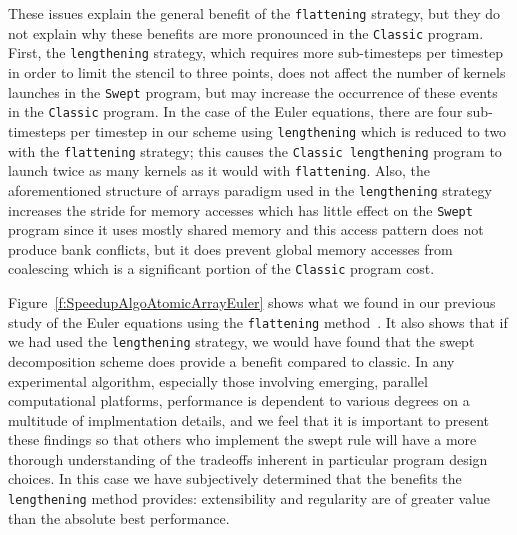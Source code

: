 These issues explain the general benefit of the \texttt{flattening} strategy, but they do not explain why these benefits are more pronounced in the \texttt{Classic} program.
First, the \texttt{lengthening} strategy, which requires more sub-timesteps per timestep in order to limit the stencil to three points, does not affect the number of kernels launches in the \texttt{Swept} program, but may increase the occurrence of these events in the \texttt{Classic} program.
In the case of the Euler equations, there are four sub-timesteps per timestep in our scheme using \texttt{lengthening} which is reduced to two with the \texttt{flattening} strategy; this causes the \texttt{Classic lengthening} program to launch twice as many kernels as it would with \texttt{flattening}. 
Also, the aforementioned structure of arrays paradigm used in the \texttt{lengthening} strategy increases the stride for memory accesses which has little effect on the \texttt{Swept} program since it uses mostly shared memory and this access pattern does not produce bank conflicts, but it does prevent global memory accesses from coalescing which is a significant portion of the \texttt{Classic} program cost.

Figure~\ref{f:SpeedupAlgoAtomicArrayEuler} shows what we found in our previous study of the Euler equations using the \texttt{flattening} method~\cite{OurJCP}.
It also shows that if we had used the \texttt{lengthening} strategy, we would have found that the swept decomposition scheme does provide a benefit compared to classic.
In any experimental algorithm, especially those involving emerging, parallel computational platforms, performance is dependent to various degrees on a multitude of implmentation details, and we feel that it is important to present these findings so that others who implement the swept rule will have a more thorough understanding of the tradeoffs inherent in particular program design choices.
In this case we have subjectively determined that the benefits the \texttt{lengthening} method provides: extensibility and regularity are of greater value than the absolute best performance.